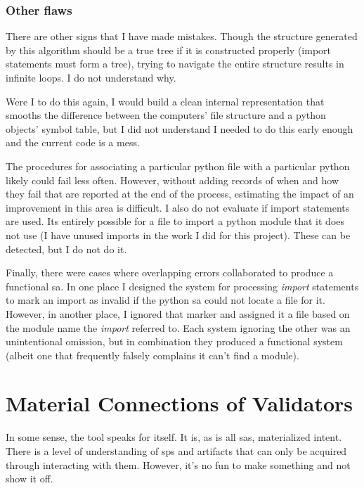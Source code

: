 \documentclass[a4paper,man,natbib,floatsintext]{apa6}
\begin{document}
  \subsubsection{Other flaws}
  There are other signs that I have made mistakes. Though the structure generated by this algorithm should be a true tree if it is constructed properly (import statements must form a tree), trying to navigate the entire structure results in infinite loops. I do not understand why. 

  Were I to do this again, I would build a clean internal representation that smooths the difference between the computers' file structure and a python objects' symbol table, but I did not understand I needed to do this early enough and the current code is a mess. 

  The procedures for associating a particular \Gls{python} file with a particular \Gls{python} likely could fail less often. However, without adding records of when and how they fail that are reported at the end of the process, estimating the impact of an improvement in this area is difficult. I also do not evaluate if import statements are used. Its entirely possible for a file to import a \Gls{python} module that it does not use (I have unused imports in the work I did for this project). These can be detected, but I do not do it.

  Finally, there were cases where overlapping errors collaborated to produce a functional \gls{sa}. In one place I designed the system for processing \textit{import} statements to mark an import as invalid if the \Gls{python} \gls{sa} could not locate a file for it. However, in another place, I ignored that marker and assigned it a file based on the module name the \textit{import} referred to. Each system ignoring the other was an unintentional omission, but in combination they produced a functional system (albeit one that frequently falsely complains it can't find a module).

  \section{Material Connections of Validators}
  In some sense, the tool speaks for itself. It is, as is all \glspl{sa}, materialized intent. There is a level of understanding of \glspl{sp} and artifacts that can only be acquired through interacting with them. However, it's no fun to make something and not show it off.
\end{document}
